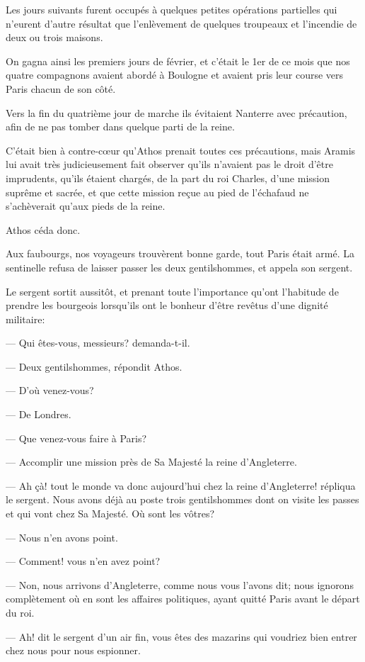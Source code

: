 Les jours suivants furent occupés à quelques petites opérations partielles qui n'eurent d'autre résultat que l'enlèvement de quelques troupeaux et l'incendie de deux ou trois maisons.

On gagna ainsi les premiers jours de février, et c'était le 1er de ce mois que nos quatre compagnons avaient abordé à Boulogne et avaient pris leur course vers Paris chacun de son côté.

Vers la fin du quatrième jour de marche ils évitaient Nanterre avec précaution, afin de ne pas tomber dans quelque parti de la reine.

C'était bien à contre-cœur qu'Athos prenait toutes ces précautions, mais Aramis lui avait très judicieusement fait observer qu'ils n'avaient pas le droit d'être imprudents, qu'ils étaient chargés, de la part du roi Charles, d'une mission suprême et sacrée, et que cette mission reçue au pied de l'échafaud ne s'achèverait qu'aux pieds de la reine.

Athos céda donc.

Aux faubourgs, nos voyageurs trouvèrent bonne garde, tout Paris était armé. La sentinelle refusa de laisser passer les deux gentilshommes, et appela son sergent.

Le sergent sortit aussitôt, et prenant toute l'importance qu'ont l'habitude de prendre les bourgeois lorsqu'ils ont le bonheur d'être revêtus d'une dignité militaire:

— Qui êtes-vous, messieurs? demanda-t-il.

— Deux gentilshommes, répondit Athos.

— D'où venez-vous?

— De Londres.

— Que venez-vous faire à Paris?

— Accomplir une mission près de Sa Majesté la reine d'Angleterre.

— Ah çà! tout le monde va donc aujourd'hui chez la reine d'Angleterre! répliqua le sergent. Nous avons déjà au poste trois gentilshommes dont on visite les passes et qui vont chez Sa Majesté. Où sont les vôtres?

— Nous n'en avons point.

— Comment! vous n'en avez point?

— Non, nous arrivons d'Angleterre, comme nous vous l'avons dit; nous ignorons complètement où en sont les affaires politiques, ayant quitté Paris avant le départ du roi.

— Ah! dit le sergent d'un air fin, vous êtes des mazarins qui voudriez bien entrer chez nous pour nous espionner.

